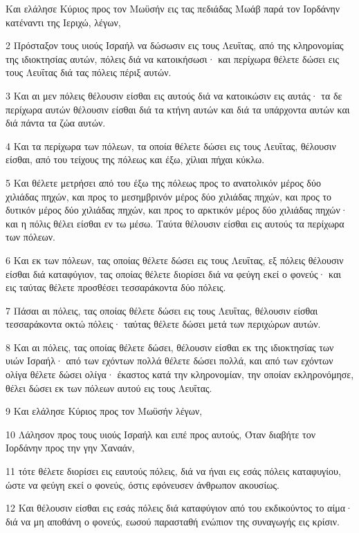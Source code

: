 \par Και ελάλησε Κύριος προς τον Μωϋσήν εις τας πεδιάδας Μωάβ παρά τον Ιορδάνην κατέναντι της Ιεριχώ, λέγων,
\par 2 Πρόσταξον τους υιούς Ισραήλ να δώσωσιν εις τους Λευΐτας, από της κληρονομίας της ιδιοκτησίας αυτών, πόλεις διά να κατοικήσωσι· και περίχωρα θέλετε δώσει εις τους Λευΐτας διά τας πόλεις πέριξ αυτών.
\par 3 Και αι μεν πόλεις θέλουσιν είσθαι εις αυτούς διά να κατοικώσιν εις αυτάς· τα δε περίχωρα αυτών θέλουσιν είσθαι διά τα κτήνη αυτών και διά τα υπάρχοντα αυτών και διά πάντα τα ζώα αυτών.
\par 4 Και τα περίχωρα των πόλεων, τα οποία θέλετε δώσει εις τους Λευΐτας, θέλουσιν είσθαι, από του τείχους της πόλεως και έξω, χίλιαι πήχαι κύκλω.
\par 5 Και θέλετε μετρήσει από του έξω της πόλεως προς το ανατολικόν μέρος δύο χιλιάδας πηχών, και προς το μεσημβρινόν μέρος δύο χιλιάδας πηχών, και προς το δυτικόν μέρος δύο χιλιάδας πηχών, και προς το αρκτικόν μέρος δύο χιλιάδας πηχών· και η πόλις θέλει είσθαι εν τω μέσω. Ταύτα θέλουσιν είσθαι εις αυτούς τα περίχωρα των πόλεων.
\par 6 Και εκ των πόλεων, τας οποίας θέλετε δώσει εις τους Λευΐτας, εξ πόλεις θέλουσιν είσθαι διά καταφύγιον, τας οποίας θέλετε διορίσει διά να φεύγη εκεί ο φονεύς· και εις ταύτας θέλετε προσθέσει τεσσαράκοντα δύο πόλεις.
\par 7 Πάσαι αι πόλεις, τας οποίας θέλετε δώσει εις τους Λευΐτας, θέλουσιν είσθαι τεσσαράκοντα οκτώ πόλεις· ταύτας θέλετε δώσει μετά των περιχώρων αυτών.
\par 8 Και αι πόλεις, τας οποίας θέλετε δώσει, θέλουσιν είσθαι εκ της ιδιοκτησίας των υιών Ισραήλ· από των εχόντων πολλά θέλετε δώσει πολλά, και από των εχόντων ολίγα θέλετε δώσει ολίγα· έκαστος κατά την κληρονομίαν, την οποίαν εκληρονόμησε, θέλει δώσει εκ των πόλεων αυτού εις τους Λευΐτας.
\par 9 Και ελάλησε Κύριος προς τον Μωϋσήν λέγων,
\par 10 Λάλησον προς τους υιούς Ισραήλ και ειπέ προς αυτούς, Όταν διαβήτε τον Ιορδάνην προς την γην Χαναάν,
\par 11 τότε θέλετε διορίσει εις εαυτούς πόλεις, διά να ήναι εις εσάς πόλεις καταφυγίου, ώστε να φεύγη εκεί ο φονεύς, όστις εφόνευσεν άνθρωπον ακουσίως.
\par 12 Και θέλουσιν είσθαι εις εσάς πόλεις διά καταφύγιον από του εκδικούντος το αίμα· διά να μη αποθάνη ο φονεύς, εωσού παρασταθή ενώπιον της συναγωγής εις κρίσιν.
